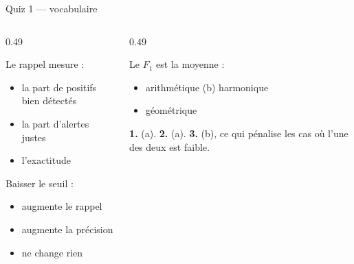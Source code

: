 \begin{frame}{Quiz 1 --- vocabulaire}
\begin{columns}[t]
\begin{column}{0.49\textwidth}
\begin{qbox}[Question 1]
Le rappel mesure :
\begin{itemize}
  \item[(a)] la part de positifs bien détectés
  \item[(b)] la part d'alertes justes
  \item[(c)] l'exactitude
\end{itemize}
\end{qbox}
\begin{qbox}[Question 2]
Baisser le seuil :
\begin{itemize}
  \item[(a)] augmente le rappel
  \item[(b)] augmente la précision
  \item[(c)] ne change rien
\end{itemize}
\end{qbox}
\end{column}
\begin{column}{0.49\textwidth}
\begin{qbox}[Question 3]
Le $F_1$ est la moyenne :
\begin{itemize}
  \item[(a)] arithmétique \quad (b) harmonique
  \item[(c)] géométrique
\end{itemize}
\end{qbox}
\begin{solbox}[Réponses]
\textbf{1.} (a). \quad \textbf{2.} (a). \quad \textbf{3.} (b), ce qui pénalise
les cas où l'une des deux est faible.
\end{solbox}
\end{column}
\end{columns}
\end{frame}
